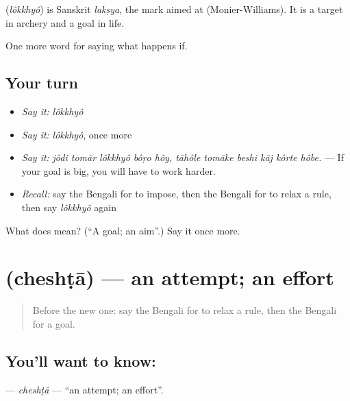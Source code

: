 \begin{cousinweb}
\textbf{} (\emph{lôkkhyô}) is Sanskrit \emph{lakṣya}, the mark aimed at (Monier-Williams). It is a target in archery and a goal in life.
\end{cousinweb}

\begin{grammarlens}[title={What you've built}]
One more word for saying what happens if.
\end{grammarlens}

\subsection*{Your turn}
\begin{itemize}
\raggedright
  \item \emph{Say it:} \emph{lôkkhyô}
  \item \emph{Say it:} \emph{lôkkhyô}, once more
  \item \emph{Say it:} \emph{jôdi tomār lôkkhyô bôṛo hôy, tāhôle tomāke beshi kāj kôrte hôbe.} — If your goal is big, you will have to work harder.
  \item \emph{Recall:} say the Bengali for to impose, then the Bengali for to relax a rule, then say \emph{lôkkhyô} again
\end{itemize}

\begin{tcolorbox}[breakable,colback=teal!4,colframe=teal!35!black,title={Before you move on}]
What does  mean? (\textquotedblleft{}A goal; an aim\textquotedblright{}.) Say it once more.
\end{tcolorbox}
\section[\texorpdfstring{\bn{চেষ্টা} (cheshṭā)}{চেষ্টা (cheshṭā)}]{ (cheshṭā) — an attempt; an effort}

\label{lesson:BN-C376-cheshta}



\begin{quote}
Before the new one: say the Bengali for to relax a rule, then the Bengali for a goal.
\end{quote}

\subsection*{You'll want to know: }
\textbf{} — \emph{cheshṭā} — \textquotedblleft{}an attempt; an effort\textquotedblright{}.

